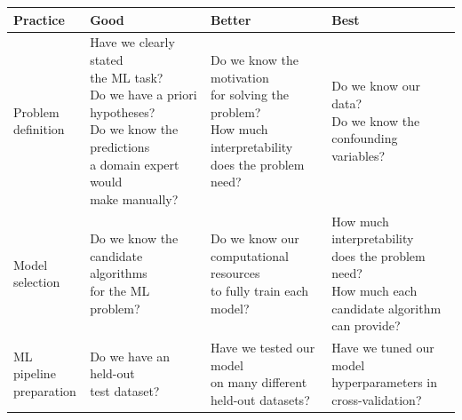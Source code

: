 \documentclass[11pt,]{article}
\begin{document}
\small

\begin{tabular}{|l|l|l|l|}
\hline

\rowcolor{lightgray}
\textbf{Practice} & \textbf{Good} & \textbf{Better} & \textbf{Best} \\ \hline

\makecell[l]{Problem \\ definition} & \makecell[l]{Have we clearly stated \\ the ML task? \\ Do we have a priori hypotheses? \\Do we know the predictions \\ a domain expert would \\ make manually?} & \makecell[l]{Do we know the motivation \\ for solving the problem? \\ How much interpretability \\ does the problem need? } & \makecell[l]{Do we know our data? \\ Do we know the confounding \\ variables? } \\ \hline

\makecell[l]{Model \\ selection} & \makecell[l]{Do we know the \\ candidate algorithms \\ for the ML problem? \\} & \makecell[l]{Do we know our \\ computational resources \\ to fully train each model?} & \makecell[l]{How much interpretability \\ does the problem need? \\ How much each \\ candidate algorithm \\ can provide?} \\ \hline

\makecell[l]{ML pipeline \\ preparation} & \makecell[l]{Do we have an held-out \\ test dataset?} & \makecell[l]{Have we tested our model \\ on many different \\ held-out datasets?} & \makecell[l]{Have we tuned our model \\ hyperparameters in \\ cross-validation?} \\ \hline


\end{tabular}
\end{document}
